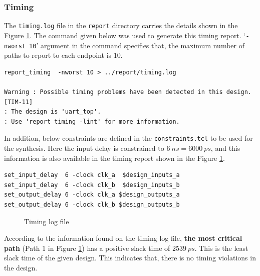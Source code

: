 \documentclass[a4paper,11pt]{article}%
\begin{document}
\subsubsection{Timing}
The {\tt timing.log} file in the {\tt report} directory carries the details shown in the Figure \ref{fig:timing_log}. The command given below was used to generate this timing report. `{\tt -nworst 10}' argument in the command specifies that, the maximum number of paths to report to each endpoint is 10\cite{genus_command_ref_2019}.

\begin{Verbatim}[frame=single]
report_timing  -nworst 10 > ../report/timing.log

Warning : Possible timing problems have been detected in this design. [TIM-11]
: The design is 'uart_top'.
: Use 'report timing -lint' for more information.
\end{Verbatim}

In addition, below constraints are defined in the {\tt constraints.tcl} to be used for the synthesis. Here the input delay is constrained to $6~ns = 6000~ps$, and this information is also available in the timing report shown in the Figure \ref{fig:timing_log}.

\begin{Verbatim}[frame=single]
set_input_delay  6 -clock clk_a  $design_inputs_a
set_input_delay  6 -clock clk_b  $design_inputs_b
set_output_delay 6 -clock clk_a $design_outputs_a
set_output_delay 6 -clock clk_b $design_outputs_b
\end{Verbatim}


\begin{figure}[h]
	\centering
	\caption{Timing log file}
	\label{fig:timing_log}
\end{figure}

According to the information found on the timing log file, \textbf{the most critical path} (Path 1 in Figure \ref{fig:timing_log}) has a positive slack time of $2539~ps$.  This is the least slack time of the given design. This indicates that, there is no timing violations in the design.\\
\end{document}
